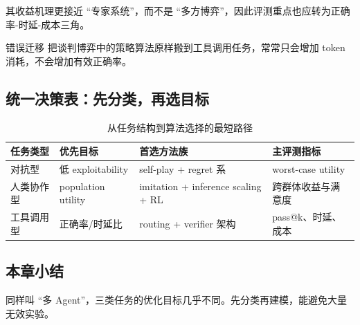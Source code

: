 其收益机理更接近 ``专家系统''，而不是 ``多方博弈''，因此评测重点也应转为正确率-时延-成本三角。

\begin{warningbox}{错误迁移}
把谈判博弈中的策略算法原样搬到工具调用任务，常常只会增加 token 消耗，不会增加有效正确率。
\end{warningbox}

\subsection{统一决策表：先分类，再选目标}
\begin{table}[H]
\centering
\begin{tabular}{p{3.1cm}p{3.4cm}p{3.2cm}p{3.2cm}}
\toprule
\textbf{任务类型} & \textbf{优先目标} & \textbf{首选方法族} & \textbf{主评测指标} \\
\midrule
对抗型 & 低 exploitability & self-play + regret 系 & worst-case utility \\
人类协作型 & population utility & imitation + inference scaling + RL & 跨群体收益与满意度 \\
工具调用型 & 正确率/时延比 & routing + verifier 架构 & pass@k、时延、成本 \\
\bottomrule
\end{tabular}
\caption{从任务结构到算法选择的最短路径}
\end{table}

\subsection{本章小结}
同样叫 ``多 Agent''，三类任务的优化目标几乎不同。先分类再建模，能避免大量无效实验。

